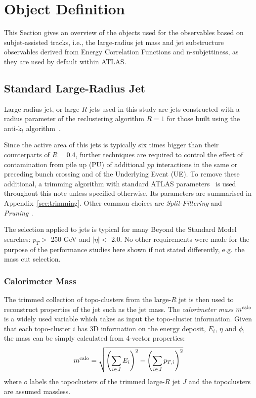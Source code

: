 \clearpage
\section{Object Definition}
\label{sec:objdef}

This Section gives an overview of the objects used for the observables based on subjet-assisted tracks, i.e., the large-radius jet mass and jet substructure observables derived from Energy Correlation Functions and n-subjettiness, as they are used by default within ATLAS.

\subsection{Standard Large-Radius Jet}


Large-radius jet, or large-$R$ jets used in this study are jets constructed with a radius parameter of the reclustering algorithm $R=1$ for those built using the anti-k$_t$ algorithm~\cite{antiktalgo}. 



Since the active area of this jets is typically six times bigger than their counterparts of $R=0.4$, further techniques are required to control the effect of contamination from pile up (PU) of additional $pp$ interactions in the same or preceding bunch crossing and of the Underlying Event (UE). To remove these additional, a trimming algorithm with standard ATLAS parameters~\cite{art35} is used throughout this note unless specified otherwise. Its parameters are summarised in Appendix~\ref{sec:trimming}. 
Other common choices are \textit{Split-Filtering} and \textit{Pruning}~\cite{substructure1}.

The selection applied to \larger jets is typical for many Beyond the Standard Model searches: $p_T>$ 250 GeV and $|\eta|<$ 2.0.
No other requirements were made for the purpose of the performance studies here shown if not stated differently, e.g. the mass cut selection.


\subsubsection{Calorimeter Mass}

The trimmed collection of topo-clusters from the large-$R$ jet is then used to reconstruct properties of the jet such as the jet mass. The \textit{calorimeter mass} $m^\textrm{calo}$ is a widely used variable which takes as input the topo-cluster information. Given that each topo-cluster $i$ has 3D information on the energy deposit, $E_i$, $\eta$ and $\phi$, the mass can be simply calculated from 4-vector properties:
$$m^\textrm{calo}=\sqrt{\left(\sum_{i\in J}E_i\right)^2-\left(\sum_{i\in J}p_{T,i}\right)^2} $$
where $o$ labels the topoclusters of the trimmed large-$R$ jet $J$ and the topoclusters are assumed massless.

